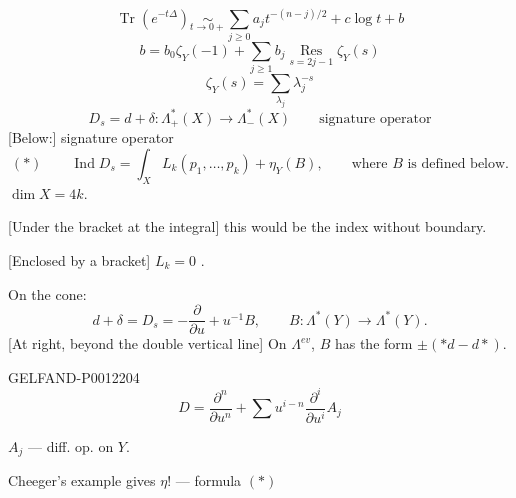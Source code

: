 \begin{equation*}
\operatorname{Tr}(e^{-t\Delta})\underset{t\to0+}{\sim}
\sum_{j\geq0}a_jt^{-(n-j)/2}+c\log t+b
\end{equation*}
\begin{equation*}
b=b_0\zeta_Y(-1)+\sum_{j\geq1}b_j
\underset{s=2j-1}{\operatorname{Res}}\zeta_Y(s)
\end{equation*}
\begin{equation*}
\zeta_Y(s)=\sum_{\lambda_j}\lambda_j^{-s}
\end{equation*}
\begin{equation*}
D_s=d+\delta:\Lambda^*_+(X)\longrightarrow\Lambda^*_-(X)
\qquad\text{signature operator}
\end{equation*}
[Below:] signature operator
\begin{equation*}
(*)\qquad \operatorname{Ind}D_s=\int_X L_k(p_1,\ldots,p_k)+\eta_Y(B),
\qquad\text{where \(B\) is defined below.}
\end{equation*}
\(\dim X=4k\).

[Under the bracket at the integral] this would be the index without boundary.

[Enclosed by a bracket] \(L_k=0\) .

On the cone:
\begin{equation*}
d+\delta=D_s=-\frac{\partial}{\partial u}+u^{-1}B,
\qquad B:\Lambda^*(Y)\longrightarrow\Lambda^*(Y).
\end{equation*}
[At right, beyond the double vertical line] On \(\Lambda^{ev}\), \(B\) has the form \(\pm(*d-d*)\).
\begin{GelfandAdjacentEvidence}{GELFAND-P001220}{4}
\begin{equation*}
D=\frac{\partial^n}{\partial u^n}+\sum u^{i-n}\frac{\partial^i}{\partial u^i}A_j
\end{equation*}
\end{GelfandAdjacentEvidence}


\(A_j\) --- diff. op. on \(Y\).


Cheeger's example gives \(\eta\)! --- formula \((*)\)


